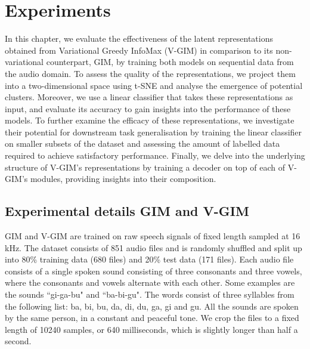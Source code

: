 \chapter{Experiments}

In this chapter, we evaluate the effectiveness of the latent representations obtained from Variational Greedy InfoMax (V-GIM) in comparison to its non-variational counterpart, GIM, by training both models on sequential data from the audio domain. To assess the quality of the representations, we project them into a two-dimensional space using t-SNE and analyse the emergence of potential clusters. Moreover, we use a linear classifier that takes these representations as input, and evaluate its accuracy to gain insights into the performance of these models. To further examine the efficacy of these representations, we investigate their potential for downstream task generalisation by training the linear classifier on smaller subsets of the dataset and assessing the amount of labelled data required to achieve satisfactory performance. Finally, we delve into the underlying structure of V-GIM's representations by training a decoder on top of each of V-GIM's modules, providing insights into their composition.


%	

	







\section{Experimental details GIM and V-GIM} \label{cha:experim_details_vgim}
		GIM and V-GIM are trained on raw speech signals of fixed length sampled at 16 kHz. The dataset consists of 851  audio files and is randomly shuffled and split up into 80\% training data (680 files) and 20\% test data (171 files). Each audio file consists of a single spoken sound consisting of three consonants and three vowels, where the consonants and vowels alternate with each other. Some examples are the sounds ``gi-ga-bu" and ``ba-bi-gu". The words consist of three syllables from the following list: ba, bi, bu, da, di, du, ga, gi and gu. All the sounds are spoken by the same person, in a constant and peaceful tone. We crop the files to a fixed length of 10240 samples, or 640 milliseconds, which is slightly longer than half a second.
		
